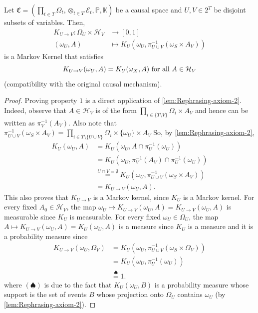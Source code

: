 \documentclass[../main.tex]{subfiles}
\begin{document}
    \begin{pro}
    \label{pro:Kernels-between-subsets-of-variables}
    Let ${\mathfrak{C} = (\prod_{t\in T}\Omega_t, \otimes_{t\in T}\mathcal{E}_t, \mathbb{P}, \mathbb{K})}$ be a causal space and ${U, V\in 2^T}$ be disjoint subsets of variables. Then,
    \begin{align*}
        K_{U\to V}: \Omega_U\times \mathcal{H}_V &\to [0,1]\\
                (\omega_U, A)&\mapsto K_U(\omega_U, \pi^{-1}_{U\cup V}(\omega_S\times A_V) )
    \end{align*}
    is a Markov Kernel that satisfies 
    $${K_{U\to V}(\omega_U, A) = K_U(\omega_X, A)\text{ for all } A \in \mathcal{H}_V}$$ (compatibility with the original causal mechanism).
    \end{pro}
    \begin{proof}
        Proving property $1$ is a direct application of \autoref{lem:Rephrasing-axiom-2}. Indeed, observe that ${A\in \mathcal{H}_V}$ is of the form ${\prod_{i\in \{T\setminus V\}}\Omega_i\times A_V}$ and hence can be written as ${\pi_V^{-1}(A_V)}$. Also note that \newline${\pi^{-1}_{U\cup V}(\omega_S\times A_V)={\prod_{i\in T\setminus \{U\cup V\}}\Omega_i\times \{\omega_U\}\times A_V}}$ So, by \autoref{lem:Rephrasing-axiom-2},
        \begin{align*}
            K_U(\omega_U, A) &= K_U(\omega_U, A\cap \pi^{-1}_U(\omega_U))\\
            &= K_U(\omega_U, \pi^{-1}_V(A_V)\cap\pi^{-1}_U(\omega_U))\\
            &\stackrel{U\cap V=\emptyset}{=} K_U(\omega_U, \pi^{-1}_{U\cup V}(\omega_S\times A_V))\\
            &= K_{U\to V}(\omega_U, A). 
        \end{align*}
        This also proves that ${K_{U\to V}}$ is a Markov kernel, since $K_U$ is a Markov kernel. For every fixed ${A_0\in \mathcal{H}_V}$, the map ${\omega_U\mapsto K_{U\to V}(\omega_U, A) = K_{U\to V}(\omega_U, A) }$ is measurable since ${K_U}$ is measurable. For every fixed ${\omega_U\in\Omega_U}$, the map ${A\mapsto K_{U\to V}(\omega_U, A) = K_U(\omega_U, A)}$ is a measure since ${K_U}$ is a measure and it is a probability measure since 
        \begin{align*}
            K_{U\to V}(\omega_U, \Omega_V) &= K_U(\omega_U, \pi^{-1}_{U\cup V}(\omega_S\times \Omega_V))\\
            &= K_U(\omega_U, \pi^{-1}_U(\omega_U))\\
            &\stackrel{\spadesuit}{=} 1.
        \end{align*} 
        where ${(\spadesuit)}$ is due to the fact that ${K_U(\omega_U, B)}$ is a probability measure whose support is the set of events ${B}$ whose projection onto ${\Omega_U}$ contains ${\omega_U}$ (by \autoref{lem:Rephrasing-axiom-2}). 

    \end{proof}
\end{document}
